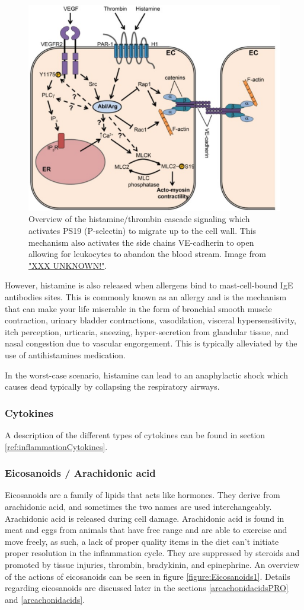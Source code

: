     \begin{figure}[ht]
        \centering
            \includegraphics[width=0.5\linewidth]{figures/Inflammation/HistaminPselectin.png} 
        \caption{Overview of the histamine/thrombin cascade signaling which activates PS19 (P-selectin) to migrate up to the cell wall. This mechanism also activates the side chains VE-cadherin to open allowing for leukocytes to abandon the blood stream. Image from \href{https://www.nature.com/articles/nature13479}{"XXX UNKNOWN!"}.
        \label{figure:histamine}}
    \end{figure}  

However, histamine is also released when allergens bind to mast-cell-bound IgE antibodies sites. This is commonly known as an allergy and is the mechanism that can make your life miserable in the form of  bronchial smooth muscle contraction, urinary bladder contractions, vasodilation, visceral hypersensitivity, itch perception, urticaria, sneezing, hyper-secretion from glandular tissue, and  nasal congestion due to vascular engorgement. This is typically alleviated by the use of antihistamines medication.

In the worst-case scenario, histamine can lead to an anaphylactic shock which causes dead typically by collapsing the respiratory airways.

\subsubsection{Cytokines}

A description of the different types of cytokines can be found in section \ref{ref:inflammationCytokines}.
   
\subsubsection{Eicosanoids / Arachidonic acid}
\label{eicosanoids}

   Eicosanoids are a family of lipids that acts like hormones. They derive from arachidonic acid, and sometimes the two names are used interchangeably. Arachidonic acid is released during cell damage. Arachidonic acid is found in meat and eggs from animals that have free range and are able to exercise and move freely, as such, a lack of proper quality items in the diet can't initiate proper resolution in the inflammation cycle. They are suppressed by steroids and promoted by tissue injuries, thrombin, bradykinin, and epinephrine. An overview of the actions of eicosanoids can be seen in figure \ref{figure:Eicosanoids1}. Details regarding eicosanoids are discussed later in the sections \ref{arcachonidacidsPRO} and \ref{arcachonidacids}.
    
